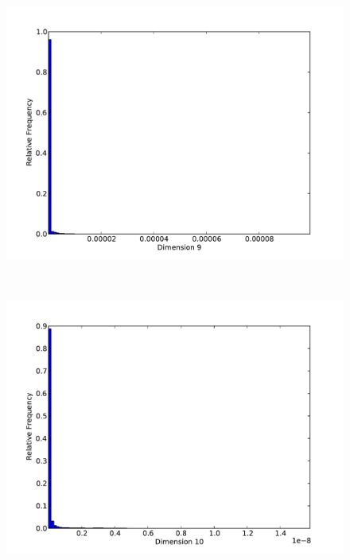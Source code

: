 \newpage

\begin{figure}[h]
	\begin{center}
		\begin{subfloat}{%
			\includegraphics[scale=0.36]{figures/histograms/astrophysics_500000_8.pdf}
		}
		\end{subfloat}~
		\begin{subfloat}{%
			\includegraphics[scale=0.36]{figures/histograms/astrophysics_500000_9.pdf}
		}
		\end{subfloat}
	\end{center}
\end{figure}

